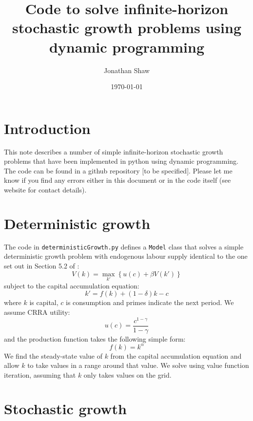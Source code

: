 \documentclass[12pt]{article}
\title{Code to solve infinite-horizon stochastic growth problems using dynamic programming}
\author{Jonathan Shaw}
\date{\today}
\begin{document}
\maketitle

\section{Introduction}

This note describes a number of simple infinite-horizon stochastic growth problems that have been implemented in python using dynamic programming. The code can be found in a github repository [to be specified]. Please let me know if you find any errors either in this document or in the code itself (see website for contact details).

\section{Deterministic growth}

The code in \texttt{deterministicGrowth.py} defines a \texttt{Model} class that solves a simple deterministic growth problem with endogenous labour supply identical to the one set out in Section 5.2 of \citet{adda2003dynamic}:
\begin{equation}
	V(k) = \max_{k'} \left\{ u(c) + \beta V(k') \right\}
\end{equation}
subject to the capital accumulation equation:
\begin{equation}
	k' = f(k) + (1 - \delta)k - c
\end{equation}
where \(k\) is capital, \(c\) is consumption and primes indicate the next period. We assume CRRA utility:
\begin{equation}
	u(c) = \frac{c^{1 - \gamma}}{1 - \gamma}
\end{equation}
and the production function takes the following simple form:
\begin{equation}
	f(k) = k^{\alpha}
\end{equation}
We find the steady-state value of \(k\) from the capital accumulation equation and allow \(k\) to take values in a range around that value. We solve using value function iteration, assuming that \(k\) only takes values on the grid.


\section{Stochastic growth}
\end{document}

